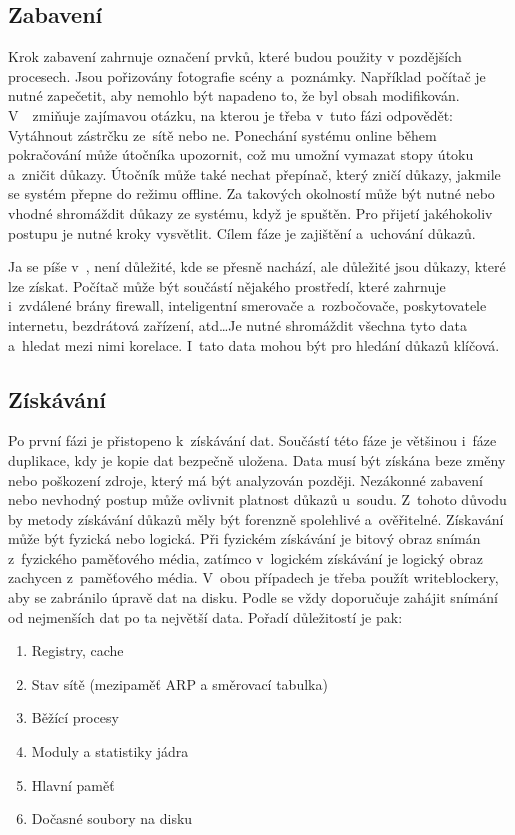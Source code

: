 \documentclass[thesis=B,czech]{FITthesis}[2012/06/26]
\begin{document}
\subsection{Zabavení}
Krok zabavení zahrnuje označení prvků, které budou použity v pozdějších procesech. Jsou pořizovány fotografie scény a~poznámky. Například počítač je nutné zapečetit, aby nemohlo být napadeno to, že byl obsah modifikován. V~\cite{for_sez}~zmiňuje zajímavou otázku, na kterou je třeba v~tuto fázi odpovědět: Vytáhnout zástrčku ze~sítě nebo ne. Ponechání systému online během pokračování může útočníka upozornit, což mu umožní vymazat stopy útoku a~zničit důkazy. Útočník může také nechat přepínač, který zničí důkazy, jakmile se systém přepne do režimu offline. Za takových okolností může být nutné nebo vhodné shromáždit důkazy ze systému, když je spuštěn. Pro přijetí jakéhokoliv postupu je nutné kroky vysvětlit. Cílem fáze je zajištění a~uchování důkazů.

Ja se píše v~\cite{palmer2002forensic}, není důležité, kde se přesně nachází, ale důležité jsou důkazy, které lze získat. Počítač může být součástí nějakého prostředí, které zahrnuje i~zvdálené brány firewall, inteligentní smerovače a~rozbočovače, poskytovatele internetu, bezdrátová zařízení, atd\dots Je nutné shromáždit všechna tyto data a~hledat mezi nimi korelace. I~tato data mohou být pro hledání důkazů klíčová.

\subsection{Získávání}
Po první fázi je přistopeno k~získávání dat. Součástí této fáze je většinou i~fáze duplikace, kdy je kopie dat bezpečně uložena. Data musí být získána beze změny nebo poškození zdroje, který má být analyzován později. Nezákonné zabavení nebo nevhodný postup může ovlivnit platnost důkazů u~soudu. Z~tohoto důvodu by metody získávání důkazů měly být forenzně spolehlivé a~ověřitelné. Získavání může být fyzická nebo logická. Při fyzickém získávání je bitový obraz snímán z~fyzického paměťového média, zatímco v~logickém získávání je logický obraz zachycen z~paměťového média. V~obou případech je třeba použít writeblockery, aby se zabránilo úpravě dat na disku. Podle \cite{for_sez} se vždy doporučuje zahájit snímání od nejmenších dat po ta největší data. Pořadí důležitostí je pak: 

\begin{enumerate}
\item Registry, cache
\item Stav sítě (mezipaměť ARP a směrovací tabulka)
\item Běžící procesy
\item Moduly a statistiky jádra
\item Hlavní paměť
\item Dočasné soubory na disku
\end{enumerate}
\end{document}

